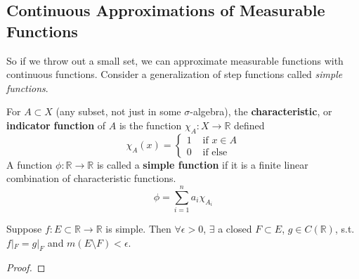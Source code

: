 \subsection{Continuous Approximations of Measurable Functions}

  So if we throw out a small set, we can approximate measurable functions with continuous functions. Consider a generalization of step functions called \textit{simple functions}. 

  \begin{definition}
    For $A \subset X$ (any subset, not just in some $\sigma$-algebra), the \textbf{characteristic}, or \textbf{indicator} \textbf{function} of $A$ is the function $\chi_A : X \longrightarrow \mathbb{R}$ defined 
    \begin{equation}
      \chi_A (x) = \begin{cases} 1 & \text{ if } x \in A \\ 0 & \text{ if else} \end{cases}
    \end{equation}
    A function $\phi: \mathbb{R} \longrightarrow \mathbb{R}$ is called a \textbf{simple function} if it is a finite linear combination of characteristic functions. 
    \begin{equation}
      \phi = \sum_{i=1}^n a_i \chi_{A_i}
    \end{equation}
  \end{definition} 

  \begin{lemma}
    Suppose $f: E \subset \mathbb{R} \to \mathbb{R}$ is simple. Then $\forall \epsilon > 0$, $\exists$ a closed $F \subset E$, $g \in C(\mathbb{R})$, s.t. $f|_F = g |_F$ and $m(E \setminus F) < \epsilon$. 
  \end{lemma}
  \begin{proof}
    
  \end{proof}

